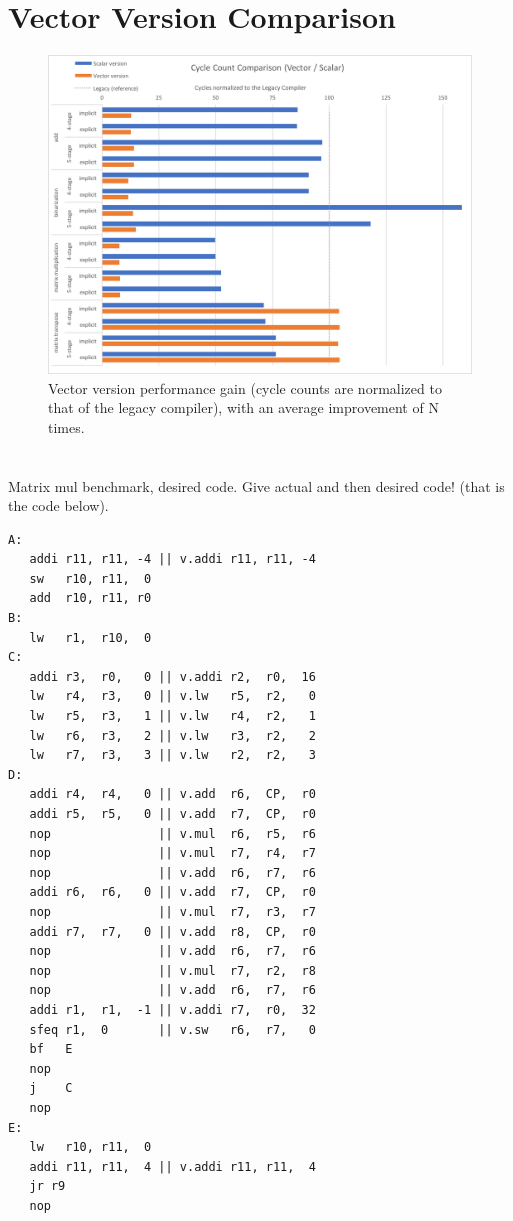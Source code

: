 \section{Vector Version Comparison}

\begin{figure}[b!]
\centering
\hspace*{-.12in}
\includegraphics[width=\textwidth]{figures/vec_cmp_prelim}
\caption{Vector version performance gain (cycle counts are normalized to that of the legacy compiler), with an average improvement of N times.}
\label{fig:legacy_scalar_cmp}
\end{figure}


\section{}

\newpage

Matrix mul benchmark, desired code. Give actual and then desired code! (that is the code below).







\begin{lstlisting}
A:
   addi r11, r11, -4 || v.addi r11, r11, -4
   sw   r10, r11,  0
   add  r10, r11, r0
B:
   lw   r1,  r10,  0
C:
   addi r3,  r0,   0 || v.addi r2,  r0,  16
   lw   r4,  r3,   0 || v.lw   r5,  r2,   0
   lw   r5,  r3,   1 || v.lw   r4,  r2,   1
   lw   r6,  r3,   2 || v.lw   r3,  r2,   2
   lw   r7,  r3,   3 || v.lw   r2,  r2,   3
D:
   addi r4,  r4,   0 || v.add  r6,  CP,  r0
   addi r5,  r5,   0 || v.add  r7,  CP,  r0
   nop               || v.mul  r6,  r5,  r6
   nop               || v.mul  r7,  r4,  r7
   nop               || v.add  r6,  r7,  r6
   addi r6,  r6,   0 || v.add  r7,  CP,  r0
   nop               || v.mul  r7,  r3,  r7
   addi r7,  r7,   0 || v.add  r8,  CP,  r0
   nop               || v.add  r6,  r7,  r6
   nop               || v.mul  r7,  r2,  r8
   nop               || v.add  r6,  r7,  r6
   addi r1,  r1,  -1 || v.addi r7,  r0,  32
   sfeq r1,  0       || v.sw   r6,  r7,   0
   bf   E
   nop
   j    C  
   nop
E:
   lw   r10, r11,  0
   addi r11, r11,  4 || v.addi r11, r11,  4
   jr r9
   nop
\end{lstlisting}